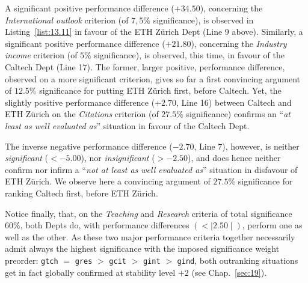 A significant positive performance difference ($+34.50$), concerning the \emph{International outlook} criterion (of $7,5\%$ significance), is observed in Listing~\vref{list:13.11} in favour of the ETH Zürich Dept (Line 9 above). Similarly, a significant positive performance difference ($+21.80$), concerning the \emph{Industry income} criterion (of $5\%$ significance), is observed, this time, in favour of the Caltech Dept (Line 17). The former, larger positive, performance difference, observed on a more significant criterion, gives so far a first convincing argument of $12.5\%$ significance for putting ETH Zürich first, before Caltech. Yet, the slightly positive performance difference ($+2.70$, Line 16) between Caltech and ETH Zürich on the \emph{Citations} criterion (of $27.5\%$ significance) confirms an ``\emph{at least as well evaluated as}'' situation in favour of the Caltech Dept.

The inverse negative performance difference ($-2.70$, Line 7), however, is neither \emph{significant} ($< -5.00$), nor \emph{insignificant} ($> -2.50$), and does hence neither confirm nor infirm a ``\emph{not at least as well evaluated as}'' situation in disfavour of ETH Zürich. We observe here a convincing argument of $27.5\%$ significance for ranking Caltech first, before ETH Zürich.

Notice finally, that, on the \emph{Teaching} and \emph{Research} criteria of total significance $60\%$, both Depts do, with performance differences $(< \mid 2.50 \mid)$, perform one as well as the other. As these two major performance criteria together necessarily admit always the highest significance with the imposed significance weight preorder: \texttt{gtch} $=$ \texttt{gres} $>$ \texttt{gcit} $>$ \texttt{gint} $>$ \texttt{gind}, both outranking situations get in fact globally confirmed at stability level $+2$ (see Chap.~\ref{sec:19}).

